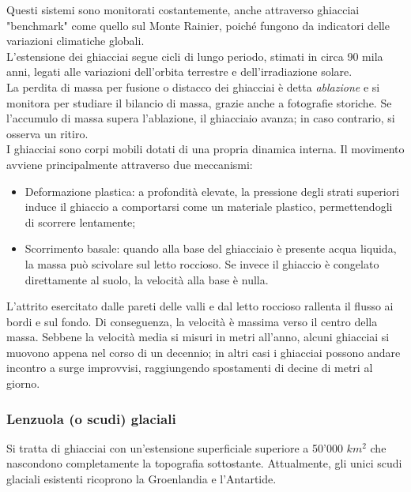 \documentclass[a4paper,12pt]{book}
\begin{document}
\noindent
Questi sistemi sono monitorati costantemente, anche attraverso ghiacciai "benchmark" come quello sul Monte Rainier, poiché fungono da indicatori delle variazioni climatiche globali.\\

\noindent
L'estensione dei ghiacciai segue cicli di lungo periodo, stimati in circa 90 mila anni, legati alle variazioni dell'orbita terrestre e dell'irradiazione solare.\\

\noindent
La perdita di massa per fusione o distacco dei ghiacciai è detta \textit{ablazione} e si monitora per studiare il bilancio di massa, grazie anche a fotografie storiche.
Se l'accumulo di massa supera l'ablazione, il ghiacciaio avanza; in caso contrario, si osserva un ritiro.\\

\noindent
I ghiacciai sono corpi mobili dotati di una propria dinamica interna.
Il movimento avviene principalmente attraverso due meccanismi:

\begin{itemize}
    \item Deformazione plastica: a profondità elevate, la pressione degli strati superiori induce il ghiaccio a comportarsi come un materiale plastico, permettendogli di scorrere lentamente;
    \item Scorrimento basale: quando alla base del ghiacciaio è presente acqua liquida, la massa può scivolare sul letto roccioso. Se invece il ghiaccio è congelato direttamente al suolo, la velocità alla base è nulla.
\end{itemize}

\noindent
L'attrito esercitato dalle pareti delle valli e dal letto roccioso rallenta il flusso ai bordi e sul fondo.
Di conseguenza, la velocità è massima verso il centro della massa.
Sebbene la velocità media si misuri in metri all'anno, alcuni ghiacciai si muovono appena nel corso di un decennio; in altri casi i ghiacciai possono andare incontro a surge improvvisi, raggiungendo spostamenti di decine di metri al giorno.

\subsubsection{\textcolor{colore2}{Lenzuola (o scudi) glaciali}}

Si tratta di ghiacciai con un'estensione superficiale superiore a 50'000 $km^2$ che nascondono completamente la topografia sottostante.
Attualmente, gli unici scudi glaciali esistenti ricoprono la Groenlandia e l'Antartide.\\
\end{document}
